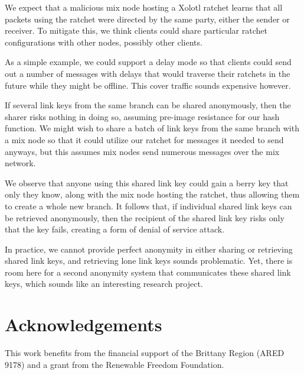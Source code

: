 \documentclass[twoside,letterpaper]{llncs}
\begin{document}
We expect that a malicious mix node hosting a Xolotl ratchet learns
that all packets using the ratchet were directed by the same party,
either the sender or receiver.  To mitigate this, we think clients
could share particular ratchet configurations with other nodes,
possibly other clients.  

As a simple example, we could support a delay mode so that clients
could send out a number of messages with delays that would traverse
their ratchets in the future while they might be offline. 
This cover traffic sounds expensive however.

If several link keys from the same branch can be shared anonymously,
then the sharer risks nothing in doing so, assuming pre-image
resistance for our hash function.  We might wish to share a batch
of link keys from the same branch with a mix node so that it could
utilize our ratchet for messages it needed to send anyways, but this
assumes mix nodes send numerous messages  over the mix network.

We observe that anyone using this shared link key could gain a berry
key that only they know, along with the mix node hosting the ratchet,
thus allowing them to create a whole new branch.  It follows that,
if individual shared link keys can be retrieved anonymously, then
the recipient of the shared link key risks only that the key fails,
creating a form of denial of service attack.

In practice, we cannot provide perfect anonymity in either sharing
or retrieving shared link keys, and retrieving lone link keys sounds
problematic.  Yet, there is room here for a second anonymity system
that communicates these shared link keys, which sounds like an
interesting research project.



\section*{Acknowledgements}
This work benefits from the financial support of the Brittany Region
(ARED 9178) and a grant from the Renewable Freedom Foundation.





\end{document}
